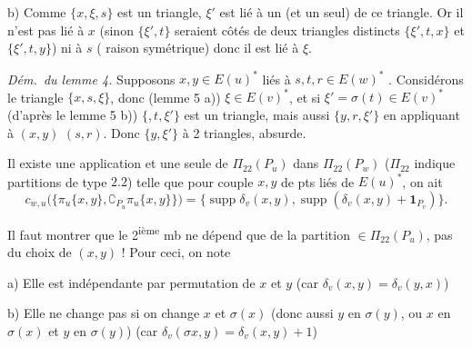 \documentclass[11pt,a4paper]{article}
\begin{document}
b) Comme $\lbrace x, \xi, s \rbrace$ est un triangle, $\xi'$ est lié à un
  (et un seul) de ce triangle. Or il n'est pas lié à $x$
(sinon $\lbrace \xi', t \rbrace$ seraient côtés de deux triangles distincts
$\lbrace \xi', t, x \rbrace$ et $\lbrace \xi', t, y \rbrace$) ni à $s$
(\struck{\ill{}} raison symétrique) donc il est lié à $\xi$.

\emph{Dém.\ du lemme 4.} Supposons $x, y \in E(u)^{*}$  liés à
$s, t, r \in E(w)^{*}$ .
Considérons le triangle $\lbrace x, s, \xi \rbrace$, donc (lemme 5 a)) $\xi \in
E(v)^{*}$, et si $\xi' = \sigma(t) \in E(v)^{*}$  (d'après le lemme 5 b)) $\lbrace$$, t, \xi' \rbrace$ est
un triangle, mais aussi $\lbrace y, r, \xi' \rbrace$ en appliquant à $(x, y)$
$(s, r)$. Donc $\lbrace y, \xi' \rbrace$  à 2 triangles,
absurde.

  Il existe une application  et une seule de $\Pi_{22}(P_u)$ dans $\Pi_{22}(P_w)$ ($\Pi_{22}$
indique partitions de type $2.2$) telle que pour  couple $x, y$ de
pts  \struck{\ill{}} liés de $E(u)^{*}$,
 on ait
\[
c_{w,u}\bigl(\lbrace \pi_u\lbrace x, y \rbrace, \complement_{P_u} \pi_u\lbrace
x, y \rbrace \rbrace\bigr) = \lbrace \operatorname{supp} \delta_v(x, y),
\operatorname{supp}(\delta_v(x, y) + \mathbf{1}_{P_v}) \rbrace .
\]


Il faut montrer que le 2\textsuperscript{ième} mb ne dépend que de la
partition $\in \Pi_{22}(P_u)$, pas du choix de $(x, y)$ ! Pour ceci, on note

a) Elle est indépendante par permutation de $x$ et $y$ \struck{\ill{}} (car
$\delta_v(x, y) = \delta_v(y, x)$)

b) Elle ne change pas si on change $x$ et $\sigma(x)$ (donc aussi $y$ en
$\sigma(y)$, ou $x$ en $\sigma(x)$ et $y$ en $\sigma(y)$) (car $\delta_v(\sigma
x, y) = \delta_v(x, y) + 1$)
\end{document}
